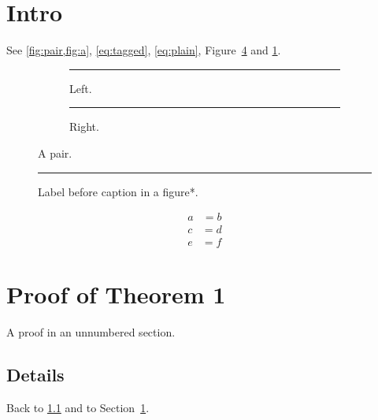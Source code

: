 \documentclass{article}
\begin{document}
\section{Intro}\label{sec:intro}
See \cref{fig:pair,fig:a}, \eqref{eq:tagged}, \eqref{eq:plain}, Figure~\ref{fig:early} and \cref{sec:intro}.
\begin{figure}\centering
\begin{subfigure}{0.4\textwidth}\label{fig:a}\rule{1cm}{1cm}\caption{Left.}\end{subfigure}
\begin{subfigure}{0.4\textwidth}\rule{1cm}{1cm}\caption{Right.}\label{fig:b}\end{subfigure}
\caption{A pair.\label{fig:pair}}
\end{figure}
\begin{figure}\centering\label{fig:early}\rule{1cm}{1cm}\caption{Label before caption in a figure*.}\end{figure}
\begin{align*}
a &= b \tag{T1}\label{eq:tagged}
\end{align*}
\begin{align}
c &= d \nonumber\\
e &= f \label{eq:plain}
\end{align}
\section*{Proof of Theorem 1}
A proof in an unnumbered section.
\subsection{Details}\label{sec:details}
Back to \cref{sec:details} and to Section~\ref{sec:intro}.
\end{document}
